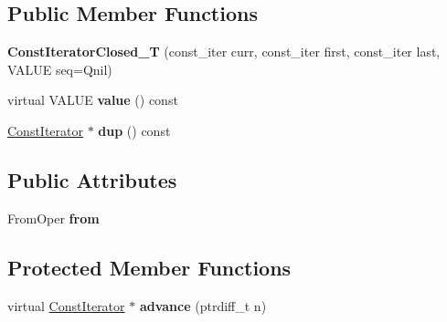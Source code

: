 \subsection*{Public Member Functions}
\begin{DoxyCompactItemize}
\item 
{\bfseries Const\+Iterator\+Closed\+\_\+T} (const\+\_\+iter curr, const\+\_\+iter first, const\+\_\+iter last, V\+A\+L\+UE seq=Qnil)\hypertarget{classswig_1_1ConstIteratorClosed__T_a042e208d5f5e6399aa8bbb5dd7146161}{}\label{classswig_1_1ConstIteratorClosed__T_a042e208d5f5e6399aa8bbb5dd7146161}

\item 
virtual V\+A\+L\+UE {\bfseries value} () const \hypertarget{classswig_1_1ConstIteratorClosed__T_a027b375ae1019e94208747ab05bb252e}{}\label{classswig_1_1ConstIteratorClosed__T_a027b375ae1019e94208747ab05bb252e}

\item 
\hyperlink{structswig_1_1ConstIterator}{Const\+Iterator} $\ast$ {\bfseries dup} () const \hypertarget{classswig_1_1ConstIteratorClosed__T_ad0cfca7c16eaed3f9f9f668cefed0ef2}{}\label{classswig_1_1ConstIteratorClosed__T_ad0cfca7c16eaed3f9f9f668cefed0ef2}

\end{DoxyCompactItemize}
\subsection*{Public Attributes}
\begin{DoxyCompactItemize}
\item 
From\+Oper {\bfseries from}\hypertarget{classswig_1_1ConstIteratorClosed__T_a736db18a7b1d308cf38bfbc6c87f5671}{}\label{classswig_1_1ConstIteratorClosed__T_a736db18a7b1d308cf38bfbc6c87f5671}

\end{DoxyCompactItemize}
\subsection*{Protected Member Functions}
\begin{DoxyCompactItemize}
\item 
virtual \hyperlink{structswig_1_1ConstIterator}{Const\+Iterator} $\ast$ {\bfseries advance} (ptrdiff\+\_\+t n)\hypertarget{classswig_1_1ConstIteratorClosed__T_a7a22072d80ddca1c26be2e0cb7f9bc45}{}\label{classswig_1_1ConstIteratorClosed__T_a7a22072d80ddca1c26be2e0cb7f9bc45}

\end{DoxyCompactItemize}
